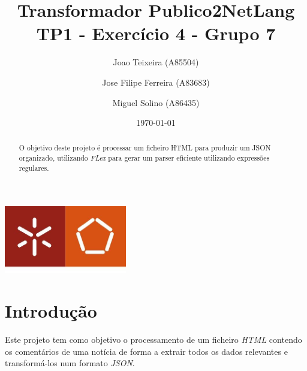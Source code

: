 \documentclass[a4paper]{report}
\begin{document}
\title{Transformador Publico2NetLang \\
\large TP1 - Exercício 4 - Grupo 7}
\author{Joao Teixeira (A85504) \and Jose Filipe Ferreira (A83683) \and Miguel
Solino (A86435)}
\date{\today}

\begin{center}
    \begin{minipage}{0.75\linewidth}
        \centering
        \includegraphics[width=0.4\textwidth]{eng.jpeg}\par\vspace{1cm}
        \vspace{1.5cm}
        \href{https://www.uminho.pt/PT}
        {\color{black}{\scshape\LARGE Universidade do Minho}} \par
        \vspace{1cm}
        \href{https://www.di.uminho.pt/}
        {\color{black}{\scshape\Large Departamento de Informática}} \par
        \vspace{1.5cm}
        \maketitle
    \end{minipage}
\end{center}

\begin{abstract}
    \begin{center}
        O objetivo deste projeto é processar um ficheiro HTML para produzir um
        JSON organizado, utilizando \textit{FLex} para gerar um parser eficiente
        utilizando expressões regulares.
    \end{center}
\end{abstract}

\tableofcontents

\pagebreak

\chapter{Introdução}
Este projeto tem como objetivo o processamento de um ficheiro \textit{HTML}
contendo os comentários de uma notícia de forma a extrair todos os dados
relevantes e transformá-los num formato \textit{JSON}.
\end{document}
